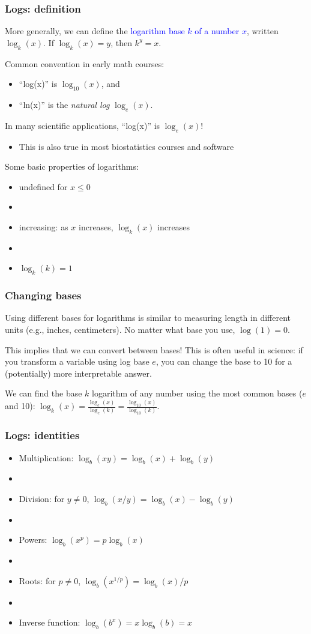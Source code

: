 \documentclass[11pt]{beamer}
\newcommand{\myframe}[1]{\begin{frame} \frametitle{#1}}
\begin{document}
\myframe{Logs: definition}
More generally, we can define the \textcolor{blue}{logarithm base $k$ of a number $x$}, written $\log_k(x)$. If $\log_k(x) = y$, then $k^y = x$.

Common convention in early math courses: 
\vspace{-0.4cm}
\begin{itemize}
\item ``log(x)'' is $\log_{10}(x)$, and
\item ``ln(x)'' is the \emph{natural log} $\log_e(x)$.
\end{itemize}  

In many scientific applications, ``log(x)'' is $\log_e(x)$!
\vspace{-0.3cm}
\begin{itemize}
\item This is also true in most biostatistics courses and software
\end{itemize}

Some basic properties of logarithms:
\vspace{-0.3cm}
\begin{itemize}
\item undefined for $x \leq 0$
\item[]
\item increasing: as $x$ increases, $\log_k(x)$ increases
\item[]
\item $\log_k(k) = 1$
\end{itemize}
\end{frame}

\myframe{Changing bases}
Using different bases for logarithms is similar to measuring length in different units (e.g., inches, centimeters). No matter what base you use, $\log(1) = 0$. 

This implies that we can convert between bases! This is often useful in science: if you transform a variable using log base $e$, you can change the base to 10 for a (potentially) more interpretable answer.

We can find the base $k$ logarithm of any number using the most common bases ($e$ and 10): $\log_k(x) = \frac{\log_e(x)}{\log_e(k)} = \frac{\log_{10}(x)}{\log_{10}(k)}$.
\end{frame}

\myframe{Logs: identities}
\begin{itemize}
\item Multiplication: $\log_b(xy) = \log_b(x) + \log_b(y)$
\item[]
\item Division: for $y \neq 0$, $\log_b(x/y) = \log_b(x) - \log_b(y)$
\item[]
\item Powers: $\log_b(x^p) = p \log_b(x)$
\item[]
\item Roots: for $p \neq 0$, $\log_b(x^{1/p}) = \log_b(x)/p$
\item[]
\item Inverse function: $\log_b(b^x) = x\log_b(b) = x$
\end{itemize}
\end{frame}
\end{document}

